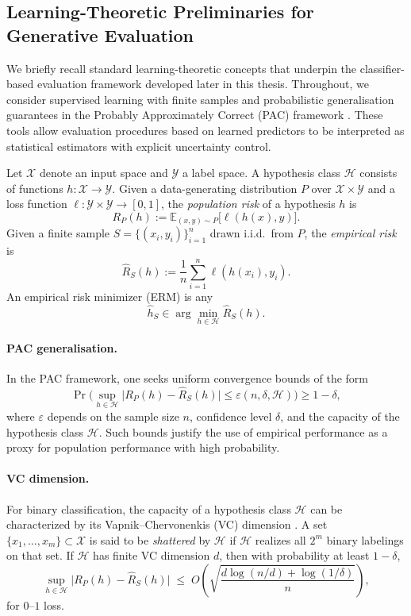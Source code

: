 \subsection{Learning-Theoretic Preliminaries for Generative Evaluation}
\label{sec:theory:eval_preliminaries}
We briefly recall standard learning-theoretic concepts that underpin the
classifier-based evaluation framework developed later in this thesis.
Throughout, we consider supervised learning with finite samples and
probabilistic generalisation guarantees in the
Probably Approximately Correct (PAC) framework
\citep{vapnik1998statistical}.
These tools allow evaluation procedures based on learned predictors to be
interpreted as statistical estimators with explicit uncertainty control.

Let $\mathcal{X}$ denote an input space and $\mathcal{Y}$ a label space.
A hypothesis class $\mathcal{H}$ consists of functions
$h : \mathcal{X} \to \mathcal{Y}$.
Given a data-generating distribution $P$ over $\mathcal{X}\times\mathcal{Y}$ and
a loss function $\ell : \mathcal{Y}\times\mathcal{Y}\to[0,1]$, the
\emph{population risk} of a hypothesis $h$ is
\[
R_P(h) := \mathbb{E}_{(x,y)\sim P}\bigl[\ell(h(x),y)\bigr].
\]
Given a finite sample $S=\{(x_i,y_i)\}_{i=1}^n$ drawn i.i.d.\ from $P$, the
\emph{empirical risk} is
\[
\widehat R_S(h) := \frac{1}{n}\sum_{i=1}^n \ell(h(x_i),y_i).
\]
An empirical risk minimizer (ERM) is any
\[
\hat h_S \in \arg\min_{h\in\mathcal{H}} \widehat R_S(h).
\]

\paragraph{PAC generalisation.}
In the PAC framework, one seeks uniform convergence bounds of the form
\[
\Pr\Big(
\sup_{h\in\mathcal{H}}
\bigl|R_P(h) - \widehat R_S(h)\bigr|
\le \varepsilon(n,\delta,\mathcal{H})
\Big) \ge 1-\delta,
\]
where $\varepsilon$ depends on the sample size $n$, confidence level $\delta$,
and the capacity of the hypothesis class $\mathcal{H}$.
Such bounds justify the use of empirical performance as a proxy for population
performance with high probability.

\paragraph{VC dimension.}
For binary classification, the capacity of a hypothesis class $\mathcal{H}$ can
be characterized by its Vapnik--Chervonenkis (VC) dimension
\citep{vapnik1998statistical}.
A set $\{x_1,\dots,x_m\}\subset\mathcal{X}$ is said to be \emph{shattered} by
$\mathcal{H}$ if $\mathcal{H}$ realizes all $2^m$ binary labelings on that set.
If $\mathcal{H}$ has finite VC dimension $d$, then with probability at least
$1-\delta$,
\[
\sup_{h\in\mathcal{H}}
\bigl|R_P(h)-\widehat R_S(h)\bigr|
\;\le\;
O\!\left(
\sqrt{\frac{d\log(n/d)+\log(1/\delta)}{n}}
\right),
\]
for $0$--$1$ loss.

